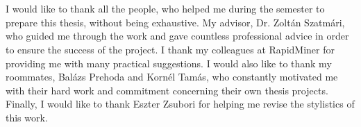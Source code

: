 \chapter*{\koszonetnyilvanitas}

I would like to thank all the people, who helped me during the semester to prepare this thesis, without being exhaustive. My advisor, Dr. Zoltán Szatmári, who guided me through the work and gave countless professional advice in order to ensure the success of the project. I thank my colleagues at RapidMiner for providing me with many practical suggestions. I would also like to thank my roommates, Balázs Prehoda and Kornél Tamás, who constantly motivated me with their hard work and commitment concerning their own thesis projects. Finally, I would like to thank Eszter Zsubori for helping me revise the stylistics of this work.